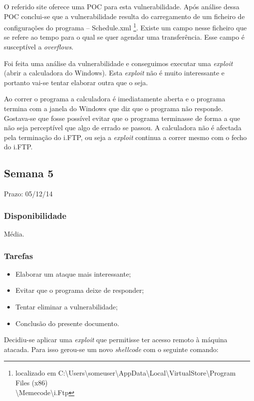 \documentclass[a4paper]{article}
\begin{document}
O referido site oferece uma POC para esta vulnerabilidade. Após análise dessa POC conclui-se que a vulnerabilidade resulta do carregamento de um ficheiro de configurações do programa -- Schedule.xml \footnote{localizado em C:\textbackslash Users\textbackslash someuser\textbackslash AppData\textbackslash Local\textbackslash VirtualStore\textbackslash Program Files (x86)\\ \textbackslash Memecode\textbackslash i.Ftp}. Existe um campo nesse ficheiro que se refere ao tempo para o qual se quer agendar uma transferência. Esse campo é susceptível a \textit{overflows}.

Foi feita uma análise da vulnerabilidade e conseguimos executar uma \textit{exploit} (abrir a calculadora do Windows). Esta \textit{exploit} não é muito interessante e portanto vai-se tentar elaborar outra que o seja.

Ao correr o programa a calculadora é imediatamente aberta e o programa termina com a janela do Windows que diz que o programa não responde. Gostava-se que fosse possível evitar que o programa terminasse de forma a que não seja perceptível que algo de errado se passou. A calculadora não é afectada pela terminação do i.FTP, ou seja a \textit{exploit} continua a correr mesmo com o fecho do i.FTP.


\subsection{Semana 5}
Prazo: 05/12/14
\subsubsection{Disponibilidade}
Média.
\subsubsection{Tarefas}
\begin{itemize}
	\item Elaborar um ataque mais interessante;
	\item Evitar que o programa deixe de responder;
	\item Tentar eliminar a vulnerabilidade;
	\item Conclusão do presente documento.
\end{itemize}

Decidiu-se aplicar uma \textit{exploit} que permitisse ter acesso remoto à máquina atacada. Para isso gerou-se um novo \textit{shellcode} com o seguinte comando:
\end{document}
